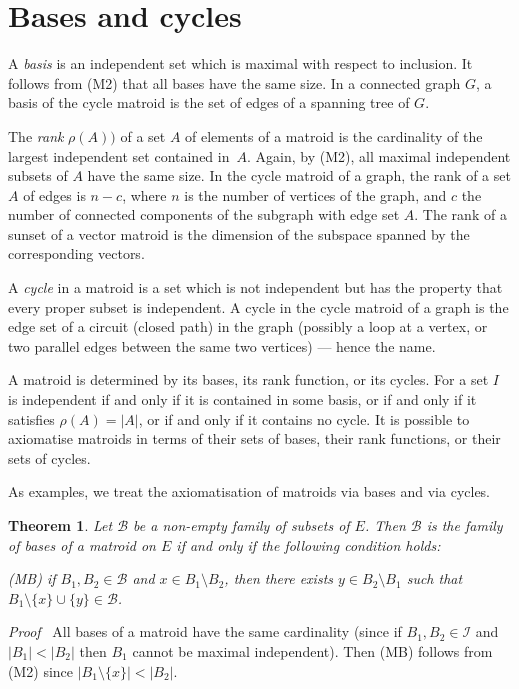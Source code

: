 \documentclass[12pt]{article}
\newtheorem{theorem}{Theorem}[section]
\newcommand{\head}[1]{\medbreak\noindent\textit{#1}\ }
\begin{document}
\section{Bases and cycles}

A \emph{basis} is an independent set which is maximal with respect
to inclusion. It follows from (M2) that all bases have the same
size. In a connected graph $G$, a basis of the cycle matroid
is the set of edges of a spanning tree of $G$.

The \emph{rank} $\rho(A))$ of a set $A$ of elements of a matroid
is the cardinality of the largest independent set contained in~$A$.
Again, by (M2), all maximal independent subsets of $A$ have the
same size. In the cycle matroid of a graph, the rank of a set $A$
of edges is $n-c$, where $n$ is the number of vertices of the
graph, and $c$ the number of connected components of the subgraph
with edge set $A$. The rank of a sunset of a vector matroid is
the dimension of the subspace spanned by the corresponding
vectors.

A \emph{cycle} in a matroid is a set which is not independent
but has the property that every proper subset is independent.
A cycle in the cycle matroid of a graph is the edge set of a
circuit (closed path) in the graph (possibly a loop at a vertex,
or two parallel edges between the same two vertices) --- hence
the name.

A matroid is determined by its bases, its rank function, or its
cycles. For a set $I$ is independent if and only if it is
contained in some basis, or if and only if it satisfies
$\rho(A)=|A|$, or if and only if it contains no cycle. It is
possible to axiomatise matroids in terms of their sets of bases,
their rank functions, or their sets of cycles.

As examples, we treat the axiomatisation of matroids via bases and
via cycles.

\begin{theorem}
Let $\mathcal{B}$ be a non-empty family of subsets of $E$. Then
$\mathcal{B}$ is the family of bases of a matroid on $E$ if and
only if the following condition holds:
\begin{description}
\item{\textrm{(MB)}} if $B_1,B_2\in\mathcal{B}$ and
$x\in B_1\setminus B_2$, then there exists $y\in B_2\setminus B_1$
such that $B_1\setminus\{x\}\cup\{y\}\in\mathcal{B}$.
\end{description}
\end{theorem}

\head{Proof} All bases of a matroid have the same cardinality (since if
$B_1, B_2\in\mathcal{I}$ and $|B_1|<|B_2|$ then $B_1$ cannot be maximal
independent). Then (MB) follows from (M2) since $|B_1\setminus\{x\}|<|B_2|$.
\end{document}
